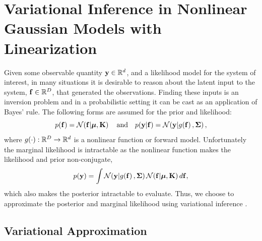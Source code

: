 \documentclass{article} %
\begin{document}
\section{Variational Inference in Nonlinear Gaussian Models with Linearization}
\label{sec:gausmod}

Given some observable quantity $\mathbf{y} \in \mathbb{R}^{d}$, and a likelihood model for
the system of interest, in many situations it is desirable to reason about the
latent input to the system, $\mathbf{f}\in\mathbb{R}^{D}$, that generated the
observations. Finding these inputs is an inversion problem and in a
probabilistic setting it can be cast as an application of Bayes' rule.
The following forms are assumed for the prior and likelihood:
\begin{equation}
    p\!\left({\mathbf{f}}\right) = \mathcal{N}\!\left({\mathbf{f}}\middle\vert{\ensuremath{\boldsymbol{\mu}}, \ensuremath{\mathbf{K}}}\right)
    \quad \text{and} \quad
    p\!\left({\mathbf{y}}\middle\vert{\ensuremath{\mathbf{f}}}\right) = \mathcal{N}\!\left({\mathbf{y}}\middle\vert{\ensuremath{g\!\left({{\mathbf{f}}}\right)}, \ensuremath{\boldsymbol{\Sigma}}}\right),
    \label{eq:priorlike}
\end{equation}
where $g\!\left({{\cdot}}\right) : \mathbb{R}^{D} \to \mathbb{R}^{d}$ is a nonlinear function or
forward model. Unfortunately the marginal likelihood is intractable
as the nonlinear function makes the likelihood and prior non-conjugate,
\begin{equation}
    p\!\left({\mathbf{y}}\right) = \int \mathcal{N}\!\left({\mathbf{y}}\middle\vert{\ensuremath{g\!\left({{\mathbf{f}}}\right)}, \ensuremath{\boldsymbol{\Sigma}}}\right)
        \mathcal{N}\!\left({\mathbf{f}}\middle\vert{\ensuremath{\boldsymbol{\mu}}, \ensuremath{\mathbf{K}}}\right) d\mathbf{f},
    \label{eq:marglike}
\end{equation}
which also makes the posterior intractable to evaluate. Thus, we choose to
approximate the posterior and marginal likelihood using variational inference
\cite{Jordan1999}.


\subsection{Variational Approximation}
\end{document}
